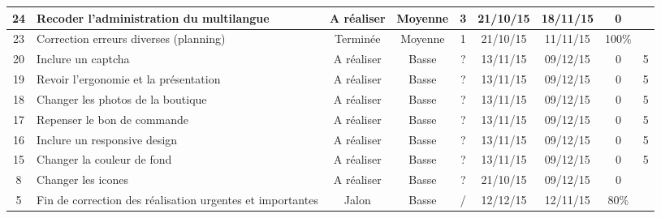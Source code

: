 \begin{tabular}{ | c | p{4cm} | c | c | c | c | c | c | c |  }
24 & Recoder l'administration du multilangue & A réaliser & Moyenne & 3 &
	21/10/15 & 18/11/15 & 0 & \\ \hline
23 & Correction erreurs diverses (planning)
	& Terminée & Moyenne & 1 & 21/10/15 & 11/11/15 & 100\% & \\ \hline
	
20 & Inclure un captcha & A réaliser & Basse & ? & 13/11/15 &
	09/12/15 & 0 & 5 \\ \hline
19 & Revoir l'ergonomie et la présentation & A réaliser & Basse & ? & 13/11/15
	& 09/12/15 & 0 & 5 \\ \hline
18 & Changer les photos de la boutique & A réaliser & Basse & ? & 13/11/15 &
	09/12/15 & 0 & 5 \\ \hline
17 & Repenser le bon de commande & A réaliser & Basse & ? & 13/11/15 & 09/12/15
	& 0 & 5 \\ \hline
16 & Inclure un responsive design & A réaliser & Basse & ? &
	13/11/15 & 09/12/15 & 0 & 5 \\ \hline
15 & Changer la couleur de fond & A réaliser & Basse & ? & 13/11/15 & 09/12/15
	& 0 & 5  \\ \hline
8 & Changer les icones & A réaliser & Basse & ? & 21/10/15 & 09/12/15 & 0 & \\
\hline

5 & Fin de correction des réalisation urgentes et importantes & Jalon & Basse &
	/ & 12/12/15 & 12/11/15 & 80\% & \\ \hline
 \end{tabular}